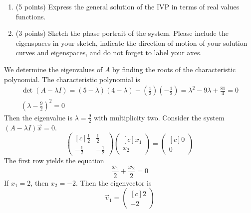 \documentclass[11pt, titlepage]{article}
\begin{document}
\begin{enumerate}
\begin{enumerate}[label={(\alph*)}]
      \item (5 points) Express the general solution of the IVP in terms of real values functions.

      \item (3 points) Sketch the phase portrait of the system.
      Please include the eigenspaces in your sketch,
      indicate the direction of motion of your solution curves and eigenspaces,
      and do not forget to label your axes.
    \end{enumerate}

    \begin{solution}
      We determine the eigenvalues of \(A\) by finding the roots of the characteristic polynomial.
      The characteristic polynomial is
      \begin{gather*}
        \det(A - \lambda I) = (5 - \lambda) (4 - \lambda) - \left( \frac{1}{2} \right) \left(-\frac{1}{2} \right) =
        \lambda^{2} - 9 \lambda + \frac{81}{4} = 0 \\
        \left(\lambda - \frac{9}{2}\right)^{2} = 0
      \end{gather*}
      Then the eigenvalue is \(\lambda = \frac{9}{2}\) with multiplicity two.
      Consider the system \((A - \lambda I) \vec{x} = 0\).
      \begin{equation*}
        \begin{pmatrix*}[c]
          \frac{1}{2} & \frac{1}{2} \\
          -\frac{1}{2} & -\frac{1}{2}
        \end{pmatrix*}
        \begin{pmatrix*}[c]
          x_{1} \\
          x_{2}
        \end{pmatrix*} =
        \begin{pmatrix*}[c]
          0 \\
          0
        \end{pmatrix*}
      \end{equation*}
      The first row yields the equation
      \begin{equation*}
        \frac{x_{1}}{2} + \frac{x_{2}}{2} = 0
      \end{equation*}
      If \(x_{1} = 2\), then \(x_{2} = -2\). Then the eigenvector is
      \begin{equation*}
        \vec{v}_{1} =
        \begin{pmatrix*}[c]
          2 \\
          -2
        \end{pmatrix*}

\end{equation*}
\end{solution}
\end{enumerate}
\end{document}

